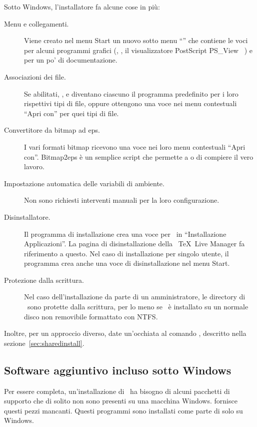 \documentclass{article}
\begin{document}
Sotto Windows, l'installatore fa alcune cose in più:
\begin{description}
\item[Menu e collegamenti.] Viene creato nel menu Start un nuovo sotto
  menu ``\TL'' che contiene le voci per alcuni programmi grafici
  (, , il visualizzatore PostScript PS\_View
  \Dash\ ) e per un po' di documentazione. 
\item[Associazioni dei file.] Se abilitati, ,  e
   diventano ciascuno il programma predefinito per i loro
  rispettivi tipi di file, oppure ottengono una voce nei menu contestuali
  ``Apri con'' per quei tipi di file.
\item[Convertitore da bitmap ad eps.] I vari formati bitmap ricevono una
  voce  nei loro menu contestuali ``Apri con''.
  Bitmap2eps è un semplice script che permette a  o
   di compiere il vero lavoro.
\item[Impostazione automatica delle variabili di ambiente.] Non sono
  richiesti interventi manuali per la loro configurazione.
\item[Disinstallatore.] Il programma di installazione crea una voce per
  \TL\ in ``Installazione Applicazioni''. La pagina di disinstallazione
  della \GUI\ \TeX\ Live Manager fa riferimento a questo. Nel caso di
  installazione per singolo utente, il programma crea anche una voce di
  disinstallazione nel menu Start.
\item[Protezione dalla scrittura.] Nel caso dell'installazione da parte
  di un amministratore, le directory di \TL\ sono protette dalla
  scrittura, per lo meno se \TL\ è installato su un normale disco non
  removibile formattato con NTFS.
\end{description}

Inoltre, per un approccio diverso, date un'occhiata al comando 
, descritto nella sezione~\ref{sec:sharedinstall}.

\subsection{Software aggiuntivo incluso sotto Windows}

Per essere completa, un'installazione di \TL\ ha bisogno di alcuni
pacchetti di supporto che di solito non sono presenti su una macchina
Windows. \TL{} fornisce questi pezzi mancanti. Questi programmi sono
installati come parte di \TL{} solo su Windows.
\end{document}
